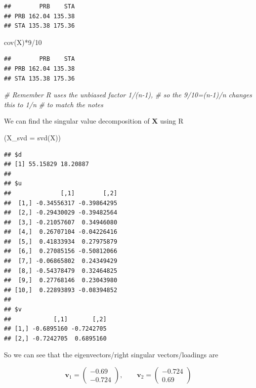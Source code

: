 \documentclass[
]{book}
\newenvironment{Shaded}{\begin{snugshade}}{\end{snugshade}}
\newcommand{\AttributeTok}[1]{\textcolor[rgb]{0.77,0.63,0.00}{#1}}
\newcommand{\CommentTok}[1]{\textcolor[rgb]{0.56,0.35,0.01}{\textit{#1}}}
\newcommand{\DecValTok}[1]{\textcolor[rgb]{0.00,0.00,0.81}{#1}}
\newcommand{\FunctionTok}[1]{\textcolor[rgb]{0.00,0.00,0.00}{#1}}
\newcommand{\NormalTok}[1]{#1}
\newcommand{\SpecialCharTok}[1]{\textcolor[rgb]{0.00,0.00,0.00}{#1}}
\theoremstyle{definition}
\theoremstyle{definition}
\theoremstyle{definition}
\theoremstyle{definition}
\theoremstyle{remark}
\begin{document}
\begin{verbatim}
##        PRB    STA
## PRB 162.04 135.38
## STA 135.38 175.36
\end{verbatim}

\begin{Shaded}
\begin{Highlighting}[]
\FunctionTok{cov}\NormalTok{(X)}\SpecialCharTok{*}\DecValTok{9}\SpecialCharTok{/}\DecValTok{10} 
\end{Highlighting}
\end{Shaded}

\begin{verbatim}
##        PRB    STA
## PRB 162.04 135.38
## STA 135.38 175.36
\end{verbatim}

\begin{Shaded}
\begin{Highlighting}[]
\CommentTok{\# Remember R uses the unbiased factor 1/(n{-}1), }
\CommentTok{\# so the 9/10=(n{-}1)/n changes this to 1/n }
\CommentTok{\# to match the notes}
\end{Highlighting}
\end{Shaded}

We can find the singular value decomposition of \(\mathbf X\) using R

\begin{Shaded}
\begin{Highlighting}[]
\NormalTok{(}\AttributeTok{X\_svd =} \FunctionTok{svd}\NormalTok{(X))}
\end{Highlighting}
\end{Shaded}

\begin{verbatim}
## $d
## [1] 55.15829 18.20887
## 
## $u
##              [,1]        [,2]
##  [1,] -0.34556317 -0.39864295
##  [2,] -0.29430029 -0.39482564
##  [3,] -0.21057607  0.34946080
##  [4,]  0.26707104 -0.04226416
##  [5,]  0.41833934  0.27975879
##  [6,]  0.27085156 -0.50812066
##  [7,] -0.06865802  0.24349429
##  [8,] -0.54378479  0.32464825
##  [9,]  0.27768146  0.23043980
## [10,]  0.22893893 -0.08394852
## 
## $v
##            [,1]       [,2]
## [1,] -0.6895160 -0.7242705
## [2,] -0.7242705  0.6895160
\end{verbatim}

So we can see that the eigenvectors/right singular vectors/loadings are

\[\mathbf v_1=\begin{pmatrix} -0.69 \\ -0.724 \end{pmatrix},\qquad \mathbf v_2=\begin{pmatrix} -0.724 \\ 0.69 \end{pmatrix}\]
\end{document}
